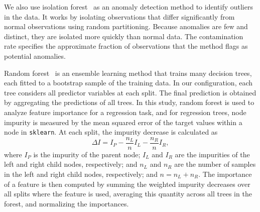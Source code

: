 We also use isolation forest~\cite{liu2008isolation} as an anomaly detection method to identify outliers in the data.
It works by isolating observations that differ significantly from normal observations using random partitioning.
Because anomalies are few and distinct, they are isolated more quickly than normal data.
The contamination rate specifies the approximate fraction of observations that the method flags as potential anomalies.

Random forest~\cite{breiman2001random} is an ensemble learning method that trains many decision trees, each fitted to a bootstrap sample of the training data.
In our configuration, each tree considers all predictor variables at each split.
The final prediction is obtained by aggregating the predictions of all trees.
In this study, random forest is used to analyze feature importance for a regression task, and for regression trees, node impurity is measured by the mean squared error of the target values within a node in \texttt{sklearn}.
At each split, the impurity decrease is calculated as
\begin{equation}
	\Delta I = I_P - \frac{n_L}{n}I_L - \frac{n_R}{n}I_R,
\end{equation}
where \(I_P\) is the impurity of the parent node; \(I_L\) and \(I_R\) are the impurities of the left and right child nodes, respectively; and \(n_L\) and \(n_R\) are the number of samples in the left and right child nodes, respectively; and \(n = n_L + n_R\).
The importance of a feature is then computed by summing the weighted impurity decreases over all splits where the feature is used, averaging this quantity across all trees in the forest, and normalizing the importances.
